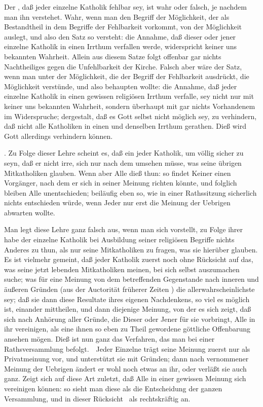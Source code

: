 \begin{aufza}
\begin{aufzb}
\item Der , daß jeder einzelne Katholik fehlbar sey, ist wahr oder falsch, je nachdem man ihn verstehet. Wahr, wenn man den Begriff der Möglichkeit, der als Bestandtheil in dem Begriffe der Fehlbarkeit vorkommt, von der  Möglichkeit auslegt, und also den Satz so versteht: die Annahme, daß dieser oder jener einzelne Katholik in einen Irrthum verfallen werde, widerspricht keiner uns bekannten Wahrheit.
Allein aus diesem Satze folgt offenbar gar nichts Nachtheiliges gegen die Unfehlbarkeit der Kirche. Falsch aber wäre der Satz, wenn man unter der Möglichkeit, die der Begriff der Fehlbarkeit ausdrückt, die  Möglichkeit verstünde, und also behaupten wollte: die Annahme, daß jeder einzelne Katholik in einen gewissen religiösen Irrthum verfalle, sey nicht nur mit keiner uns bekannten Wahrheit, sondern überhaupt mit gar nichts Vorhandenem im Widerspruche; dergestalt, daß es Gott selbst nicht möglich sey, zu verhindern, daß nicht alle Katholiken in einen und denselben Irrthum gerathen. Dieß wird Gott allerdings verhindern können.
\end{aufzb}
\end{aufza}\par
{}. Zu Folge dieser Lehre scheint es, daß ein jeder Katholik, um völlig sicher zu seyn, daß er nicht irre, sich nur nach dem umsehen müsse, was seine übrigen Mitkatholiken glauben. Wenn aber Alle dieß thun: so findet Keiner einen Vorgänger, nach dem er sich in seiner Meinung richten könnte, und folglich bleiben Alle unentschieden; beiläufig eben so, wie in einer Rathssitzung sicherlich nichts entschieden würde, wenn Jeder nur erst die Meinung der Uebrigen abwarten wollte.\par
{} Man legt diese Lehre ganz falsch aus, wenn man sich vorstellt, zu Folge ihrer habe der einzelne Katholik bei Ausbildung seiner religiösen Begriffe nichts Anderes zu thun, als nur seine Mitkatholiken zu fragen, was sie hierüber glauben. Es ist vielmehr gemeint, daß jeder Katholik zuerst noch ohne Rücksicht auf das, was seine jetzt lebenden Mitkatholiken meinen, bei sich selbst auszumachen suche; was für eine Meinung von dem betreffenden Gegenstande nach inneren und äußeren Gründen (aus der Auctorität früherer Zeiten \udgl ) die allerwahrscheinlichste sey; daß sie dann diese Resultate ihres eigenen Nachdenkens, so viel es möglich ist, einander mittheilen, und dann diejenige Meinung, von der es sich zeigt, daß sich nach Anhörung aller Gründe, die Dieser oder Jener für sie vorbringt, Alle in ihr vereinigen, als eine ihnen so eben zu Theil gewordene göttliche Offenbarung ansehen mögen. Dieß ist nun ganz das Verfahren, das man bei einer Rathsversammlung befolgt.~\ Jeder Einzelne trägt seine Meinung zuerst nur als Privatmeinung vor, und unterstützt sie mit Gründen; dann nach vernommener Meinung der Uebrigen ändert er wohl noch etwas an ihr, oder verläßt sie auch ganz. Zeigt sich auf diese Art zuletzt, daß Alle in einer gewissen Meinung sich vereinigen können: so sieht man diese als die Entscheidung der ganzen Versammlung, und in dieser Rücksicht \zB\ als rechtskräftig an.\par
